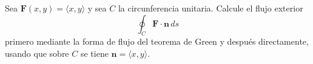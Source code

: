 Sea $\mathbf{F}(x,y)=\langle x,y\rangle$ y sea $C$ la circunferencia unitaria. Calcule el flujo exterior
\[
\oint_C\mathbf{F}\cdot\mathbf{n}\,ds
\]
primero mediante la forma de flujo del teorema de Green y después directamente, usando que sobre $C$ se tiene $\mathbf{n}=\langle x,y\rangle$.
